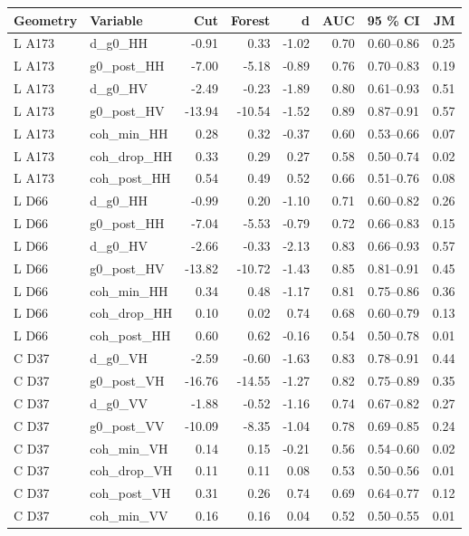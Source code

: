 \begin{tabular}{llrrrrcr}
\toprule
Geometry & Variable & Cut & Forest & d & AUC & 95 \% CI & JM \\
\midrule
L A173 & d\_g0\_HH & -0.91 & 0.33 & -1.02 & 0.70 & 0.60--0.86 & 0.25 \\
L A173 & g0\_post\_HH & -7.00 & -5.18 & -0.89 & 0.76 & 0.70--0.83 & 0.19 \\
L A173 & d\_g0\_HV & -2.49 & -0.23 & -1.89 & 0.80 & 0.61--0.93 & 0.51 \\
L A173 & g0\_post\_HV & -13.94 & -10.54 & -1.52 & 0.89 & 0.87--0.91 & 0.57 \\
L A173 & coh\_min\_HH & 0.28 & 0.32 & -0.37 & 0.60 & 0.53--0.66 & 0.07 \\
L A173 & coh\_drop\_HH & 0.33 & 0.29 & 0.27 & 0.58 & 0.50--0.74 & 0.02 \\
L A173 & coh\_post\_HH & 0.54 & 0.49 & 0.52 & 0.66 & 0.51--0.76 & 0.08 \\
L D66 & d\_g0\_HH & -0.99 & 0.20 & -1.10 & 0.71 & 0.60--0.82 & 0.26 \\
L D66 & g0\_post\_HH & -7.04 & -5.53 & -0.79 & 0.72 & 0.66--0.83 & 0.15 \\
L D66 & d\_g0\_HV & -2.66 & -0.33 & -2.13 & 0.83 & 0.66--0.93 & 0.57 \\
L D66 & g0\_post\_HV & -13.82 & -10.72 & -1.43 & 0.85 & 0.81--0.91 & 0.45 \\
L D66 & coh\_min\_HH & 0.34 & 0.48 & -1.17 & 0.81 & 0.75--0.86 & 0.36 \\
L D66 & coh\_drop\_HH & 0.10 & 0.02 & 0.74 & 0.68 & 0.60--0.79 & 0.13 \\
L D66 & coh\_post\_HH & 0.60 & 0.62 & -0.16 & 0.54 & 0.50--0.78 & 0.01 \\
C D37 & d\_g0\_VH & -2.59 & -0.60 & -1.63 & 0.83 & 0.78--0.91 & 0.44 \\
C D37 & g0\_post\_VH & -16.76 & -14.55 & -1.27 & 0.82 & 0.75--0.89 & 0.35 \\
C D37 & d\_g0\_VV & -1.88 & -0.52 & -1.16 & 0.74 & 0.67--0.82 & 0.27 \\
C D37 & g0\_post\_VV & -10.09 & -8.35 & -1.04 & 0.78 & 0.69--0.85 & 0.24 \\
C D37 & coh\_min\_VH & 0.14 & 0.15 & -0.21 & 0.56 & 0.54--0.60 & 0.02 \\
C D37 & coh\_drop\_VH & 0.11 & 0.11 & 0.08 & 0.53 & 0.50--0.56 & 0.01 \\
C D37 & coh\_post\_VH & 0.31 & 0.26 & 0.74 & 0.69 & 0.64--0.77 & 0.12 \\
C D37 & coh\_min\_VV & 0.16 & 0.16 & 0.04 & 0.52 & 0.50--0.55 & 0.01 \\

\end{tabular}
